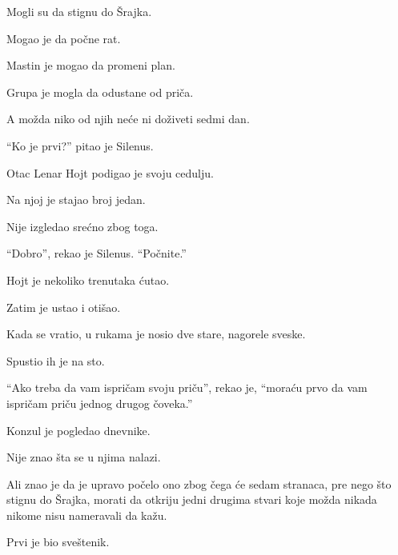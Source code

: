 Mogli su da stignu do Šrajka.

Mogao je da počne rat.

Mastin je mogao da promeni plan.

Grupa je mogla da odustane od priča.

A možda niko od njih neće ni doživeti sedmi dan.

``Ko je prvi?'' pitao je Silenus.

Otac Lenar Hojt podigao je svoju cedulju.

Na njoj je stajao broj jedan.

Nije izgledao srećno zbog toga.

``Dobro'', rekao je Silenus. ``Počnite.''

Hojt je nekoliko trenutaka ćutao.

Zatim je ustao i otišao.

Kada se vratio, u rukama je nosio dve stare, nagorele sveske.

Spustio ih je na sto.

``Ako treba da vam ispričam svoju priču'', rekao je, ``moraću prvo da vam ispričam priču jednog drugog čoveka.''

Konzul je pogledao dnevnike.

Nije znao šta se u njima nalazi.

Ali znao je da je upravo počelo ono zbog čega će sedam stranaca, pre nego što stignu do Šrajka, morati da otkriju jedni drugima stvari koje možda nikada nikome nisu nameravali da kažu.

Prvi je bio sveštenik.
